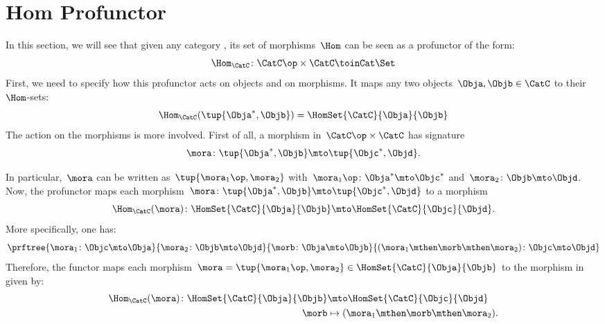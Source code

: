 

\section{Hom Profunctor}


In this section, we will see that given any category \CatC, its set of morphisms~$\Hom$ can be seen as a profunctor of the form:
\begin{equation}
    \label{eq:hom-signature}
    \Hom_\CatC\colon \CatC \op \times \CatC \toinCat \Set
\end{equation}
First, we need to specify how this profunctor acts on objects and on morphisms.
It maps any two objects~$\Obja,\Objb\in \CatC$ to their~$\Hom$-sets:
\begin{equation}
    \label{eq:hom-action}
    \Hom_\CatC(\tup{\Obja^*,\Objb})=\HomSet{\CatC}{\Obja}{\Objb}
\end{equation}
The action on the morphisms is more involved.
First of all, a morphism in~$\CatC\op \times \CatC$ has signature~
\begin{equation}
    \label{eq:hom0}
    \mora \colon \tup{\Obja^*,\Objb}\mto \tup{\Objc^*, \Objd}.
\end{equation}

In particular,~$\mora$ can be written as~$\tup{\mora_1\op,\mora_2}$ with~$\mora_1\op\colon \Obja^*\mto \Objc^*$ and~$\mora_2\colon \Objb\mto \Objd$.
Now, the profunctor maps each morphism~$\mora \colon \tup{\Obja^*,\Objb}\mto \tup{\Objc^*, \Objd}$ to a morphism
\begin{equation}
    \label{eq:hom2}
    \Hom_\CatC(\mora)\colon \HomSet{\CatC}{\Obja}{\Objb}\mto \HomSet{\CatC}{\Objc}{\Objd}.
\end{equation}
More specifically, one has:
\begin{equation}
    \label{eq:hom3}
    \prftree{\mora_1\colon \Objc \mto \Obja}{\mora_2\colon \Objb\mto \Objd}{\morb\colon \Obja\mto \Objb}{(\mora_1\mthen \morb \mthen \mora_2)\colon \Objc\mto \Objd}
\end{equation}
Therefore, the functor maps each morphism~$\mora=\tup{\mora_1\op,\mora_2}\in \HomSet{\CatC}{\Obja}{\Objb}$ to the morphism in \Set given by:
\begin{equation}
    \label{eq:hom4}
    \begin{aligned}
        \Hom_\CatC(\mora)\colon \HomSet{\CatC}{\Obja}{\Objb}&\mto \HomSet{\CatC}{\Objc}{\Objd}\\
        \morb &\mapsto (\mora_1\mthen \morb \mthen \mora_2).
    \end{aligned}
\end{equation}

